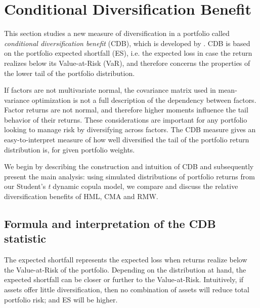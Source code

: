 
\section{Conditional Diversification Benefit} %
\label{sec:conditional_diversification_benefit}

This section studies a new measure of diversification in a portfolio called \emph{conditional diversification benefit} (CDB), which is developed by \textcite{ChristoffersenErrunzaJacobLanglois2012}. CDB is based on the portfolio expected shortfall (ES), i.e. the expected loss in case the return realizes below its Value-at-Risk (VaR), and therefore concerns the properties of the lower tail of the portfolio distribution.

If factors are not multivariate normal, the covariance matrix used in mean-variance optimization is not a full description of the dependency between factors. Factor returns are not normal, and therefore higher moments influence the tail behavior of their returns. These considerations are important for any portfolio looking to manage risk by diversifying across factors. The CDB measure gives an easy-to-interpret measure of how well diversified the tail of the portfolio return distribution is, for given portfolio weights.

We begin by describing the construction and intuition of CDB and subsequently present the main analysis: using simulated distributions of portfolio returns from our Student's \textit{t} dynamic copula model, we compare and discuss the relative diversification benefits of HML, CMA and RMW.

\subsection{Formula and interpretation of the CDB statistic}



The expected shortfall represents the expected loss when returns realize below the Value-at-Risk of the portfolio. Depending on the distribution at hand, the expected shortfall can be closer or further to the Value-at-Risk. Intuitively, if assets offer little diversification, then no combination of assets will reduce total portfolio risk; and ES will be higher. 

